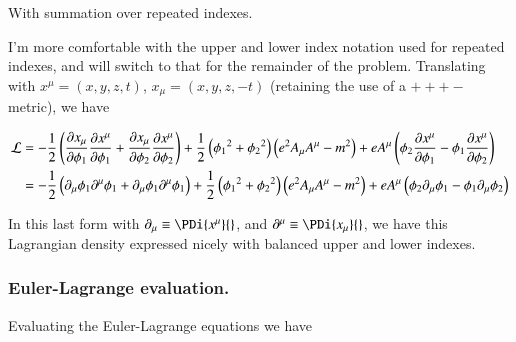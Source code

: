 \documentclass{article}
\begin{document}
With summation over repeated indexes.

I'm more comfortable with the upper and lower index notation used for repeated indexes, and will switch to that for the remainder
of the problem.  Translating with $x^\mu = (x,y,z,t)$, $x_\mu = (x,y,z,-t)$ (retaining the use of a $+++-$ metric), we have

\begin{align}
\mathcal{L} 
&= -\frac{1}{2}\left( 
\frac{\partial{x_\mu}}{\partial {\phi_1}} \frac{\partial{x^\mu}}{\partial {\phi_1}} 
+ \frac{\partial{x_\mu}}{\partial {\phi_2}} \frac{\partial{x^\mu}}{\partial {\phi_2}} 
\right)
+ \frac{1}{2}
\left( 
{\phi_1}^2 
+ {\phi_2}^2 
\right)
\left( e^2 A_\mu A^\mu - m^2 \right) 
+ e A^\mu \left(
\phi_2 \frac{\partial{x^\mu}}{\partial {\phi_1}}
-\phi_1 \frac{\partial{x^\mu}}{\partial {\phi_2}}
\right) \\
&= -\frac{1}{2}\left( 
\partial_\mu \phi_1 \partial^\mu \phi_1
+\partial_\mu \phi_1 \partial^\mu \phi_1
\right)
+ \frac{1}{2}
\left( 
{\phi_1}^2 
+ {\phi_2}^2 
\right)
\left( e^2 A_\mu A^\mu - m^2 \right) 
+ e A^\mu \left(
\phi_2 \partial_\mu {\phi_1}
-\phi_1 \partial_\mu {\phi_2}
\right) 
\end{align}

In this last form with $\partial_\mu \equiv \PDi{x^\mu}{}$, and $\partial^\mu \equiv \PDi{x_\mu}{}$, we have this Lagrangian density expressed nicely with
balanced upper and lower indexes.

%


\subsubsection{ Euler-Lagrange evaluation. }

Evaluating the Euler-Lagrange equations we have
\end{document}
